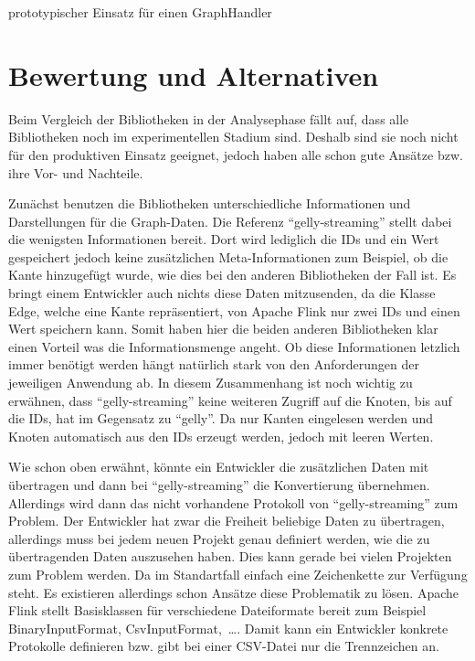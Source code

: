 \begin{listing}
\inputminted[breaklines=true]{java}{../material/code/GephiGraphHandler.java}
\caption{prototypischer Einsatz für einen GraphHandler}
\label{code:GephiGraphHandler}
\end{listing}

\section{Bewertung und Alternativen}
Beim Vergleich der Bibliotheken in der Analysephase fällt auf, dass alle
Bibliotheken noch im experimentellen Stadium sind. Deshalb sind sie noch nicht
für den produktiven Einsatz geeignet, jedoch haben alle schon gute Ansätze bzw.
ihre Vor- und Nachteile.

Zunächst benutzen die Bibliotheken unterschiedliche Informationen und Darstellungen
für die Graph-Daten. Die Referenz \enquote{gelly-streaming} stellt dabei die
wenigsten Informationen bereit. Dort wird lediglich die IDs und ein Wert
gespeichert jedoch keine zusätzlichen Meta-Informationen zum Beispiel, ob die
Kante hinzugefügt wurde, wie dies bei den anderen Bibliotheken der Fall ist.
Es bringt einem Entwickler auch nichts diese Daten mitzusenden, da die
Klasse Edge, welche eine Kante repräsentiert, von Apache Flink nur zwei IDs und
einen Wert speichern kann. Somit haben hier die beiden anderen Bibliotheken klar
einen Vorteil was die Informationsmenge angeht. Ob diese Informationen letzlich
immer benötigt werden hängt natürlich stark von den Anforderungen der jeweiligen
Anwendung ab. In diesem Zusammenhang ist noch wichtig zu erwähnen, dass
\enquote{gelly-streaming} keine weiteren Zugriff auf die Knoten, bis auf die IDs,
hat im Gegensatz zu \enquote{gelly}. Da nur Kanten eingelesen werden und Knoten
automatisch aus den IDs erzeugt werden, jedoch mit leeren Werten.

Wie schon oben erwähnt, könnte ein Entwickler die zusätzlichen Daten mit
übertragen und dann bei \enquote{gelly-streaming} die Konvertierung übernehmen.
Allerdings wird dann das nicht vorhandene Protokoll von \enquote{gelly-streaming}
zum Problem. Der Entwickler hat zwar die Freiheit beliebige Daten zu übertragen,
allerdings muss bei jedem neuen Projekt genau definiert werden, wie die zu
übertragenden Daten auszusehen haben. Dies kann gerade bei vielen Projekten zum
Problem werden. Da im Standartfall einfach eine Zeichenkette zur Verfügung steht.
Es existieren allerdings schon Ansätze diese Problematik zu lösen. Apache Flink
stellt Basisklassen für verschiedene Dateiformate bereit zum Beispiel
BinaryInputFormat, CsvInputFormat,~\dots . Damit kann ein Entwickler konkrete
Protokolle definieren bzw. gibt bei einer CSV-Datei nur die Trennzeichen an.

